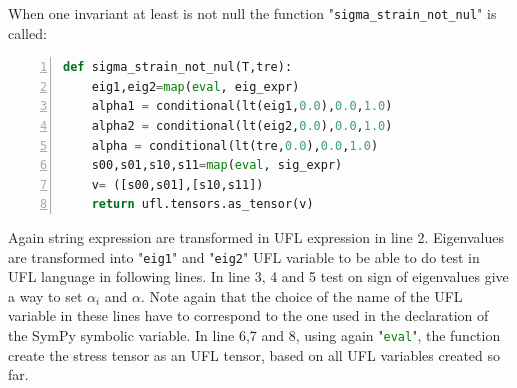 \documentclass[12pt]{article}
\newcommand{\mycodepy}[1]{\textsf{"}\lstinline[language=Python]`#1`\textsf{"}}
\begin{document}
When one invariant at least is not null the function \mycodepy{sigma_strain_not_nul} is called:
\begin{lstlisting}[numbers=left,basicstyle=\footnotesize,language=python]
def sigma_strain_not_nul(T,tre):
	eig1,eig2=map(eval, eig_expr)
	alpha1 = conditional(lt(eig1,0.0),0.0,1.0)
	alpha2 = conditional(lt(eig2,0.0),0.0,1.0)
	alpha = conditional(lt(tre,0.0),0.0,1.0)
	s00,s01,s10,s11=map(eval, sig_expr)
	v= ([s00,s01],[s10,s11])
	return ufl.tensors.as_tensor(v)
\end{lstlisting} 
Again string expression are transformed in UFL expression in line 2. Eigenvalues are transformed into \mycodepy{eig1} and \mycodepy{eig2} UFL variable to be able to do test in UFL language in following lines. In line 3, 4 and 5 test on sign of eigenvalues give a way to set $\alpha_i$ and $\alpha$. 
Note again that the choice of the name of the UFL variable in these lines have to correspond to the one used in the declaration of the SymPy symbolic variable.
In line 6,7 and 8, using again \mycodepy{eval}, the function create the stress tensor as an UFL tensor, based on all UFL variables created so far.
\end{document}
